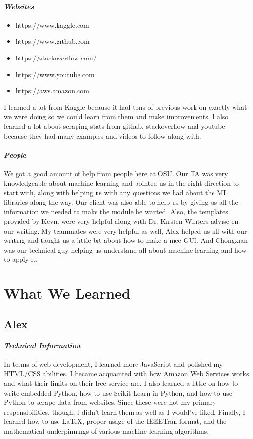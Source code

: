 \documentclass[onecolumn, draftclsnofoot,10pt, compsoc]{IEEEtran}
\begin{document}
\paragraph{\emph{Websites}}
\begin{itemize}
\item https://www.kaggle.com
\item https://www.github.com
\item https://stackoverflow.com/ 
\item https://www.youtube.com
\item https://aws.amazon.com
\end{itemize}
I learned a lot from Kaggle because it had tons of previous work on exactly what we were doing so we could learn from them and make improvements. I also learned a lot about scraping stats from github, stackoverflow and youtube because they had many examples and videos to follow along with.

\paragraph{\emph{People}}
We got a good amount of help from people here at OSU. Our TA was very knowledgeable about machine learning and pointed us in the right direction to start with, along with helping us with any questions we had about the ML libraries along the way. Our client was also able to help us by giving us all the information we needed to make the module he wanted. Also, the templates provided by Kevin were very helpful along with Dr. Kirsten Winters advise on our writing. My teammates were very helpful as well, Alex helped us all with our writing and taught us a little bit about how to make a nice GUI. And Chongxian was our technical guy helping us understand all about machine learning and how to apply it.     



\section{What We Learned}
\subsection{Alex}
\paragraph{\emph{Technical Information}}
In terms of web development, I learned more JavaScript and polished my HTML/CSS abilities. I became acquainted with how Amazon Web Services works and what their limits on their free service are. I also learned a little on how to write embedded Python, how to use Scikit-Learn in Python, and how to use Python to scrape data from websites. Since these were not my primary responsibilities, though, I didn't learn them as well as I would've liked. Finally, I learned how to use LaTeX, proper usage of the IEEETran format, and the mathematical underpinnings of various machine learning algorithms.
\end{document}
